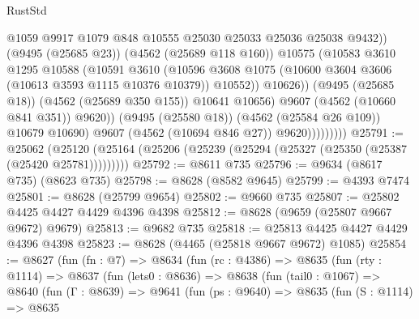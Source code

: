 \begin{lexlean}{RustStd}
\begin{coremodule}
                                    @1059
                                    @9917
                                    @1079
                                    @848
                                    @10555
                                    @25030
                                    @25033
                                    @25036
                                    @25038
                                    @9432))
                                (@9495 (@25685 @23))
                                (@4562 (@25689 @118 @160))
                                @10575
                                (@10583
                                  @3610
                                  @1295
                                  @10588
                                  (@10591
                                    @3610
                                    (@10596
                                      @3608
                                      @1075
                                      (@10600 @3604 @3606 (@10613 @3593 @1115 @10376 @10379))
                                      @10552))
                                  @10626))
                              (@9495 (@25685 @18))
                              (@4562 (@25689 @350 @155))
                              @10641
                              @10656)
                            @9607
                            (@4562 (@10660 @841 @351))
                            @9620))
                        (@9495 (@25580 @18))
                        (@4562 (@25584 @26 @109))
                        @10679
                        @10690)
                      @9607
                      (@4562 (@10694 @846 @27))
                      @9620)))))))))
@25791 := @25062
    (@25120 (@25164 (@25206 (@25239 (@25294 (@25327 (@25350 (@25387 (@25420 @25781)))))))))
@25792 := @8611 @735
@25796 := @9634 (@8617 @735) (@8623 @735)
@25798 := @8628 (@8582 @9645)
@25799 := @4393 @7474
@25801 := @8628 (@25799 @9654)
@25802 := @9660 @735
@25807 := @25802 @4425 @4427 @4429 @4396 @4398
@25812 := @8628 (@9659 (@25807 @9667 @9672) @9679)
@25813 := @9682 @735
@25818 := @25813 @4425 @4427 @4429 @4396 @4398
@25823 := @8628 (@4465 (@25818 @9667 @9672) @1085)
@25854 := @8627
    (fun (fn : @7) =>
    @8634
      (fun (rc : @4386) =>
      @8635
        (fun (rty : @1114) =>
        @8637
          (fun (lets0 : @8636) =>
          @8638
            (fun (tail0 : @1067) =>
            @8640
              (fun (Γ : @8639) =>
              @9641
                (fun (ps : @9640) =>
                @8635
                  (fun (S : @1114) =>
                  @8635

\end{coremodule}
\end{lexlean}
